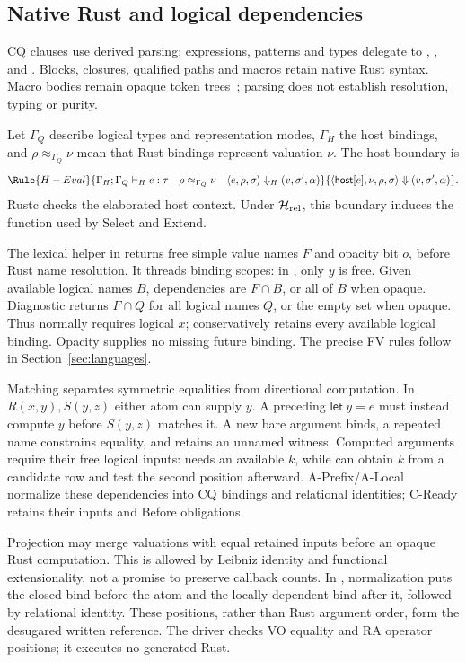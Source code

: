 \subsection{Native Rust and logical dependencies}
\label{sec:host-embedding}
\label{sec:hostobjects}
CQ clauses use derived parsing; expressions, patterns and types delegate to
, , and . Blocks, closures,
qualified paths and macros retain native Rust syntax. Macro bodies remain
opaque token trees~\cite{host-synmacro}; parsing does not establish resolution,
typing or purity.

Let $\Gamma_Q$ describe logical types and representation modes,
$\Gamma_H$ the host bindings, and $\rho\approx_{\Gamma_Q}\nu$ mean that
Rust bindings represent valuation $\nu$. The host boundary is
\[
\Rule{H-Eval}
 {\Gamma_H;\Gamma_Q\vdash_H e:\tau\quad \rho\approx_{\Gamma_Q}\nu\quad
  \langle e,\rho,\sigma\rangle\Downarrow_H(v,\sigma',\alpha)}
 {\langle\mathsf{host}[e],\nu,\rho,\sigma\rangle
  \Downarrow(v,\sigma',\alpha)}.
\]
Rustc checks the elaborated host context. Under $\mathcal H_{\rm rel}$,
this boundary induces the function used by Select and Extend.

The lexical helper in  returns free simple value names
$F$ and opacity bit $o$, before Rust name resolution. It threads binding
scopes: in , only $y$ is free. Given available logical names
$B$, dependencies are $F\cap B$, or all of $B$ when opaque. Diagnostic
 returns $F\cap Q$ for all logical names $Q$, or the empty
set when opaque. Thus  normally requires logical $x$;
 conservatively retains every available logical binding.
Opacity supplies no missing future binding. The precise FV rules follow in
Section~\ref{sec:languages}.

\label{sec:hostmovement}
Matching separates symmetric equalities from directional computation.
In $R(x,y),S(y,z)$ either atom can supply $y$. A preceding
$\mathsf{let}\ y=e$ must instead compute $y$ before $S(y,z)$ matches it.
A new bare argument binds, a repeated name constrains equality, and
\code{_} retains an unnamed witness. Computed arguments require their free
logical inputs:  needs an available $k$, while
 can obtain $k$ from a candidate row and test the second
position afterward. A-Prefix/A-Local normalize these dependencies into CQ
bindings and relational identities; C-Ready retains their inputs and Before
obligations.

Projection may merge valuations with equal retained inputs before an opaque
Rust computation. This is allowed by Leibniz identity and functional
extensionality, not a promise to preserve callback counts. In
, normalization puts the closed  bind before
the atom and the locally dependent  bind after it, followed by
relational identity. These positions, rather than Rust argument order,
form the desugared written reference. The  driver
checks VO equality and RA operator positions; it executes no generated Rust.
